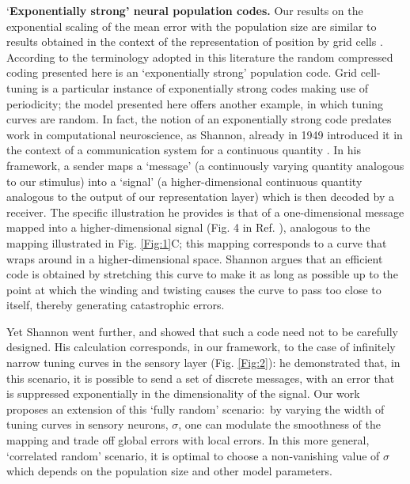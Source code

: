 \documentclass[a4paper]{article}%
\begin{document}
`\textbf{Exponentially strong' neural population codes.} Our results on the
exponential scaling of the mean error with the population size are similar to
results obtained in the context of the representation of position by grid
cells
\cite[]{Fiete2008WhatLocation,Sreenivasan2011GridComputation,Mathis2012ResolutionNeurons,Wei2015ACells}. According to the terminology adopted in this literature the random
compressed coding presented here is an `exponentially strong' population code.
Grid cell-tuning is a particular instance of exponentially strong codes making
use of periodicity; the model presented here offers another example, in which
tuning curves are random. In fact, the notion of an exponentially strong code
predates work in computational neuroscience, as Shannon, already in 1949
introduced it in the context of a communication system for a continuous
quantity \cite[]{Shannon1949CommunicationNoise}. In his framework, a sender maps
a `message' (a continuously varying quantity analogous to our stimulus) into a
`signal' (a higher-dimensional continuous quantity analogous to the output of
our representation layer) which is then decoded by a receiver. The specific
illustration he provides is that of a one-dimensional message mapped into a
higher-dimensional signal (Fig. 4 in Ref. \cite{Shannon1949CommunicationNoise}
), analogous to the mapping illustrated in Fig. \ref{Fig:1}C; this mapping
corresponds to a curve that  wraps around in a higher-dimensional space.
Shannon argues that an efficient code is obtained by stretching this curve to
make it as long as possible up to the point at which the winding and twisting
causes the curve to pass too close to itself, thereby generating catastrophic errors.

Yet Shannon went further, and showed that such a code need not to be carefully
designed. His calculation corresponds, in our framework, to the case of
infinitely narrow tuning curves in the sensory layer (Fig. \ref{Fig:2}): he
demonstrated that, in this scenario, it is possible to send a set of discrete
messages, with an error that is suppressed exponentially in the dimensionality
of the signal. Our work proposes an extension of this `fully random'
scenario:\ by varying the width of tuning curves in sensory neurons, $\sigma$,
one can modulate the smoothness of the mapping and trade off global errors
with local errors. In this more general, `correlated random' scenario, it is
optimal to choose a non-vanishing value of $\sigma$ which depends on the
population size and other model parameters.
\end{document}
